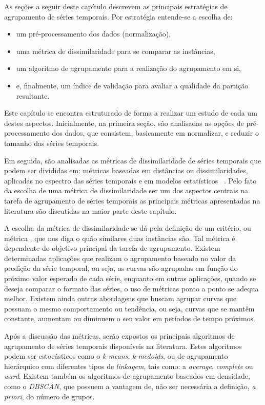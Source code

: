 As seções a seguir deste capítulo descrevem as principais estratégias de agrupamento de séries temporais. Por estratégia entende-se a escolha de:
\begin{itemize}
	\item um pré-processamento dos dados (normalização),
	\item uma métrica de dissimilaridade para se comparar as instâncias,
	\item um algoritmo de agrupamento para a realização do agrupamento em si,
	\item e, finalmente, um índice de validação para avaliar a qualidade da partição resultante.
\end{itemize}
Este capítulo se encontra estruturado de forma a realizar um estudo de cada um destes aspectos. Inicialmente, na primeira seção, são analisadas as opções de pré-processamento dos dados, que consistem, basicamente em normalizar, e reduzir o tamanho das séries temporais.

 Em seguida, são analisadas as métricas de dissimilaridade de séries temporais que podem ser divididas em: métricas baseadas em distâncias ou dissimilaridades, aplicadas no espectro das séries temporais e em modelos estatísticos ~\parencite{Liao}. Pelo fato da escolha de uma métrica de dissimilaridade ser um dos aspectos centrais na tarefa de agrupamento  de séries temporais as principais métricas apresentadas na literatura são discutidas na maior parte deste capítulo.
 
 A escolha da métrica de dissimilaridade se dá pela definição de um critério, ou métrica , que nos diga o quão similares duas instâncias são. Tal métrica é dependente do objetivo principal da tarefa de agrupamento. Existem determinadas aplicações que realizam o agrupamento baseado no valor da predição da série temporal, ou seja, as curvas são agrupadas em função do próximo valor esperado de cada série, enquanto em outras aplicações, quando se deseja comparar o formato das séries, o uso de métricas ponto a ponto se adequa melhor. Existem ainda outras abordagens que buscam agrupar curvas que possuam o mesmo comportamento ou tendência, ou seja, curvas que se mantêm constante, aumentam ou diminuem o seu valor em períodos de tempo próximos.

Após a discussão das métricas, serão expostos os principais algoritmos de agrupamento de séries temporais disponíveis na literatura. Estes algoritmos podem ser estocásticos como o \emph{k-means}, \emph{k-medoids}, ou de agrupamento hierárquico com diferentes tipos de \emph{linkagem}, tais como: a \emph{average}, \emph{complete} ou \emph{ward}. Existem também os algoritmos de agrupamento baseados em densidade, como o \emph{DBSCAN}, que possuem a vantagem de, não ser necessária a definição, \emph{a priori}, do número de grupos.

